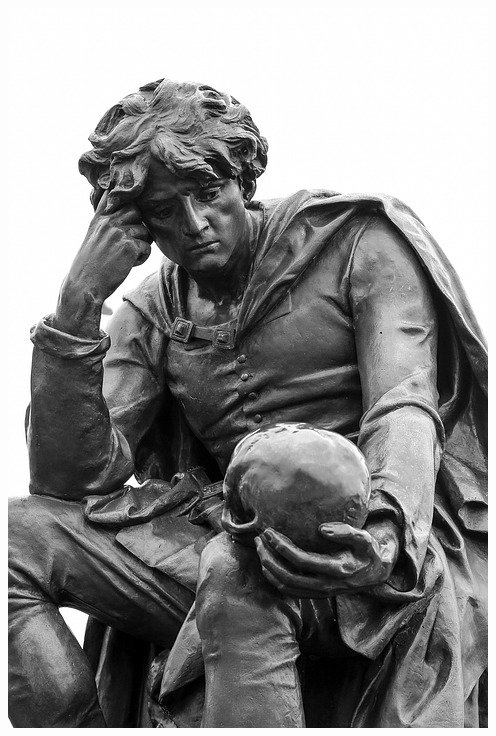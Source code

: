 \documentclass[pdf]{beamer}
\begin{document}
\begin{frame}
    \begin{center}
        \includegraphics[height=0.8\textheight, keepaspectratio]{img/hamlet-statue}
    \end{center}
\end{frame}
\end{document}
